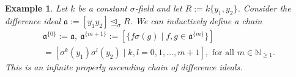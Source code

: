 \documentclass{article}
\def\NE{\mathbb{N}_{\geq1}}
\def\N{\mathbb{N}}
\def\a{\mathfrak{a}}
\def\s{\sigma}
\def\si{\unlhd_{\sigma}}
\def\fa{\text{ for all }}
\newenvironment{bew}{\begin{proof}[Proof]}{\end{proof}}
\theoremstyle{plain}
\newtheorem{ex}[Satz]{Example}
\theoremstyle{definition}
\begin{document}
\begin{ex}\label{nombasisex}
Let $k$ be a constant $\s$-field and let $R:= k\{y_1,y_2\}$. Consider the difference ideal $\a:= [y_1y_2] \si R$. We can inductively define a chain \begin{align*}\a^{\{0\}}:= \a,~ \a^{\{m+1\}}:= [\{ f \s(g) \mid f,g \in \a^{\{m\}}\}] \\ = [\s^k(y_1)\s^l(y_2) \mid k,l = 0,1,\ldots,m+1], \fa m \in \NE.\end{align*}
This is an infinite properly ascending chain of difference ideals. 



\end{ex}
\end{document}
